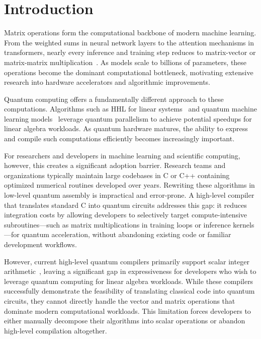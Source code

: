 \section{Introduction}
\label{sec:introduction}
Matrix operations form the computational backbone of modern machine learning. From the weighted sums in neural network layers to the attention mechanisms in transformers, nearly every inference and training step reduces to matrix-vector or matrix-matrix multiplication~\cite{alphatensor}. As models scale to billions of parameters, these operations become the dominant computational bottleneck, motivating extensive research into hardware accelerators and algorithmic improvements.

Quantum computing offers a fundamentally different approach to these computations. Algorithms such as HHL for linear systems~\cite{hhl} and quantum machine learning models~\cite{qml-nature} leverage quantum parallelism to achieve potential speedups for linear algebra workloads. As quantum hardware matures, the ability to express and compile such computations efficiently becomes increasingly important.

For researchers and developers in machine learning and scientific computing, however, this creates a significant adoption barrier. Research teams and organizations typically maintain large codebases in C or C++ containing optimized numerical routines developed over years. Rewriting these algorithms in low-level quantum assembly is impractical and error-prone. A high-level compiler that translates standard C into quantum circuits addresses this gap: it reduces integration costs by allowing developers to selectively target compute-intensive subroutines---such as matrix multiplications in training loops or inference kernels---for quantum acceleration, without abandoning existing code or familiar development workflows.

However, current high-level quantum compilers primarily support scalar integer arithmetic~\cite{quantumc,qhls}, leaving a significant gap in expressiveness for developers who wish to leverage quantum computing for linear algebra workloads. While these compilers successfully demonstrate the feasibility of translating classical code into quantum circuits, they cannot directly handle the vector and matrix operations that dominate modern computational workloads. This limitation forces developers to either manually decompose their algorithms into scalar operations or abandon high-level compilation altogether.

